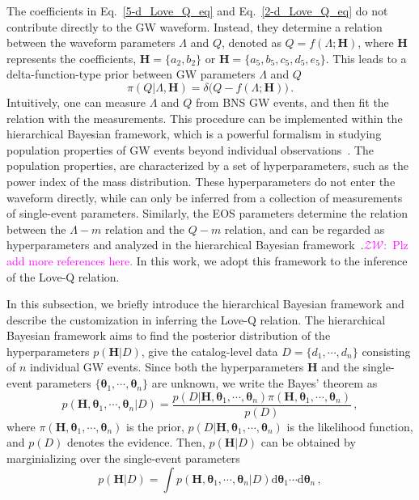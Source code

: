 \documentclass[a4paper,11pt]{article}
\newcommand{\ZW}[1]{\textcolor{magenta}{$\mathcal{ZW}$:~#1}}
\begin{document}
The coefficients in Eq.~\eqref{5-d_Love_Q_eq} and Eq.~\eqref{2-d_Love_Q_eq} 
do not contribute directly to the GW waveform. Instead, they 
determine a relation between the waveform parameters
$\Lambda$ and $Q$, denoted as $Q=f(\Lambda;\bm{H})$, where $\bm{H}$ represents
the coefficients, $\bm{H} = \{a_2, b_2\}$ or $\bm{H} = \{a_5, b_5, c_5, d_5,
e_5\}$.
This leads to a delta-function-type prior between GW parameters $\Lambda$ and $Q$
\begin{equation}
\label{delta function prior}
\pi(Q|\Lambda,\bm{H}) = \delta\big(Q-f(\Lambda;\bm{H})\big)\,.
\end{equation}
Intuitively, one can measure $\Lambda$ and $Q$ from BNS GW events, and then fit
the relation with the measurements. This procedure can be implemented within the
hierarchical Bayesian framework, which is a powerful formalism in studying population
properties of GW events beyond individual observations~\cite{Thrane_2019}. The
population properties, 
are characterized by a set of hyperparameters, such as the power index of the
mass distribution. These hyperparameters do not enter the waveform directly,
while can only be inferred from a collection of measurements of single-event
parameters. Similarly, the EOS parameters determine the relation between the
$\Lambda-m$ relation and the $Q-m$ relation, and can be regarded as
hyperparameters and analyzed in the hierarchical Bayesian
framework~\cite{Lackey:2014fwa}.\ZW{Plz add more references here.} In this work,
we adopt this framework to the inference of the Love-Q relation.


In this subsection, we briefly introduce the hierarchical Bayesian framework and
describe the customization in inferring the Love-Q relation.
The hierarchical Bayesian framework aims to
find the posterior distribution of the hyperparameters $p(\bm{H}|D)$, give the
catalog-level data $D=\{d_1,\cdots,d_n\}$ consisting of $n$ individual GW events.
Since both the hyperparameters $\bm{H}$ and the single-event parameters
$\{\bm{\theta}_1,\cdots,\bm{\theta}_n\}$ are unknown, we write the Bayes'
theorem as 
\begin{equation}
\label{bayes2}
p(\bm{H},\bm{\theta}_1,\cdots,\bm{\theta}_n|D)=\frac{p(D|\bm{H},\bm{\theta}_1,\cdots,\bm{\theta}_n)\pi(\bm{H},\bm{\theta}_1,\cdots,\bm{\theta}_n)}{p(D)}\,,
\end{equation}
where $\pi(\bm{H},\bm{\theta}_1,\cdots,\bm{\theta}_n)$ is the prior, $p(D|\bm{H},\bm{\theta}_1,\cdots,\bm{\theta}_n)$ 
is the likelihood function, and $p(D)$ denotes the evidence. Then, $p(\bm{H}|D)$
can be obtained by 
marginializing over the single-event parameters
\begin{equation}
\label{bayes1}
p(\bm{H}|D) = \int p(\bm{H},\bm{\theta}_1,\cdots,\bm{\theta}_n|D) \text{d}\bm{\theta}_1\cdots\text{d}\bm{\theta}_n\,,
\end{equation}
\end{document}
